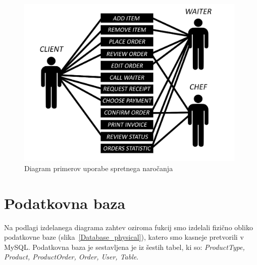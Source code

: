 \documentclass[a4paper, 12pt]{book}
\begin{document}
\begin{figure}[!htb]
\begin{center}
\includegraphics[width=11cm]{Skica2.jpg}
\end{center}
\caption{Diagram primerov uporabe spretnega naročanja}
\label{FunkVloge}
\end{figure}

 

\section{Podatkovna baza}
Na podlagi izdelanega diagrama zahtev oziroma fukcij smo izdelali fizično obliko podatkovne baze (slika~\ref{Database_physical}), katero smo kasneje pretvorili v MySQL. Podatkovna baza je sestavljena je iz šestih tabel, ki so: \textit{ProductType, Product, ProductOrder, Order, User, Table}. 
\end{document}
